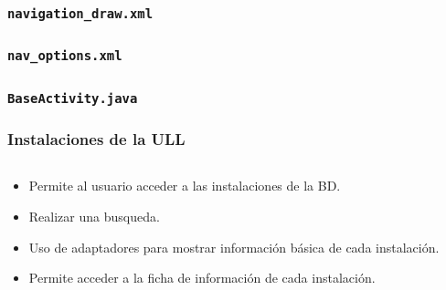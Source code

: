\begin{frame}
	\frametitle{\texttt{navigation\_draw.xml}}
	
\end{frame}


\begin{frame}
	\frametitle{\texttt{nav\_options.xml}}
	
\end{frame} 
 

\begin{frame}
	\frametitle{\texttt{BaseActivity.java}}
	
\end{frame} 
 
 

\begin{frame}
	\frametitle{Instalaciones de la ULL}
	\begin{columns}
		\begin{column}{0.6\textwidth}
			\begin{itemize}
				\item Permite al usuario acceder a las instalaciones de la BD.
				\item Realizar una busqueda.
				\item Uso de adaptadores para mostrar información básica de cada instalación.
				\item Permite acceder a la ficha de información de cada instalación.
			\end{itemize}
			\endblock{}
		\end{column}
		\begin{column}{0.4\textwidth} 
			\vfill 
			\begin{center}

\end{center}
\end{column}
\end{columns}
\end{frame}
